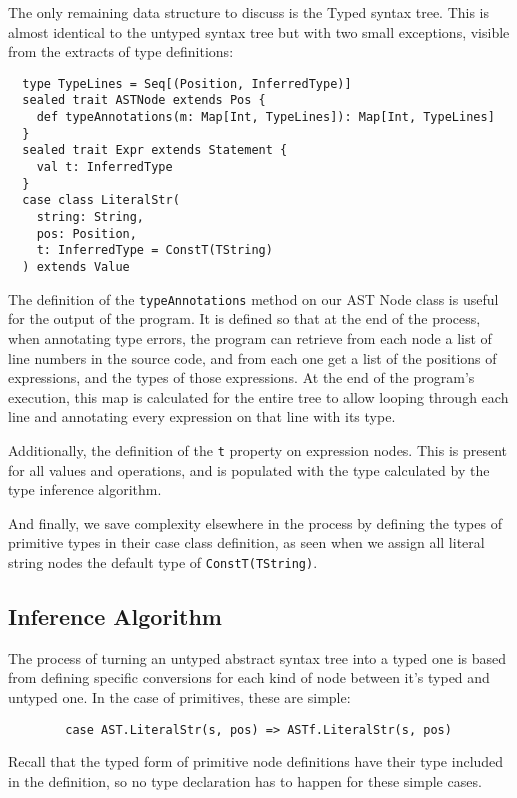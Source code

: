 \documentclass[british, twoside]{bhamthesis}
\theoremstyle{definition}
\begin{document}
      The only remaining data structure to discuss is the Typed syntax tree. This is almost identical to the untyped syntax tree but with two small exceptions, visible from the extracts of type definitions:
      \begin{lstlisting}
  type TypeLines = Seq[(Position, InferredType)]
  sealed trait ASTNode extends Pos {
    def typeAnnotations(m: Map[Int, TypeLines]): Map[Int, TypeLines]
  }
  sealed trait Expr extends Statement {
    val t: InferredType
  }
  case class LiteralStr(
    string: String,
    pos: Position,
    t: InferredType = ConstT(TString)
  ) extends Value
      \end{lstlisting}

      The definition of the \texttt{typeAnnotations} method on our AST Node class is useful for the output of the program. It is defined so that at the end of the process, when annotating type errors, the program can retrieve from each node a list of line numbers in the source code, and from each one get a list of the positions of expressions, and the types of those expressions. At the end of the program's execution, this map is calculated for the entire tree to allow looping through each line and annotating every expression on that line with its type.

      Additionally, the definition of the \texttt{t} property on expression nodes. This is present for all values and operations, and is populated with the type calculated by the type inference algorithm.

      And finally, we save complexity elsewhere in the process by defining the types of primitive types in their case class definition, as seen when we assign all literal string nodes the default type of \texttt{ConstT(TString)}.

      \subsection{Inference Algorithm}

      The process of turning an untyped abstract syntax tree into a typed one is based from defining specific conversions for each kind of node between it's typed and untyped one. In the case of primitives, these are simple:

      \begin{lstlisting}
        case AST.LiteralStr(s, pos) => ASTf.LiteralStr(s, pos)
      \end{lstlisting}

      Recall that the typed form of primitive node definitions have their type included in the definition, so no type declaration has to happen for these simple cases.
\end{document}
